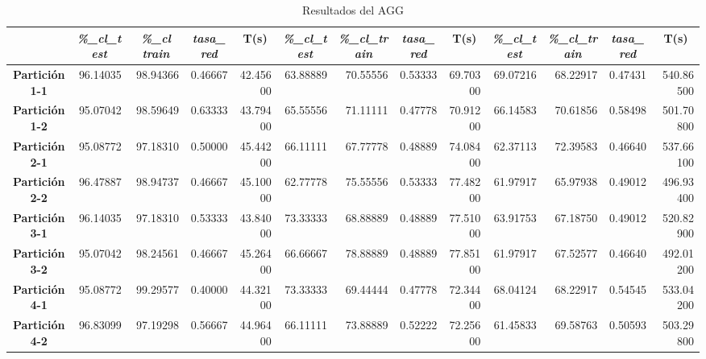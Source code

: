 \documentclass[a4paper,11pt]{article}
\begin{document}
 
 \begin{table}[H]	
    \caption*{Resultados del AGG}
    \begin{adjustbox}{width=1.1\textwidth}
    \begin{tabular}{|c|r|r|r|r|r|r|r|r|r|r|r|r|}
    \hline
    \multicolumn{1}{|l|}{} & \multicolumn{1}{c|}{\textbf{\textit{\%\_cl\_test}}} & \multicolumn{1}{c|}{\textbf{\textit{\%\_cl train}}} & \multicolumn{1}{c|}{\textbf{\textit{tasa\_red}}} & \multicolumn{1}{c|}{\textbf{T(s)}} & \multicolumn{1}{c|}{\textbf{\textit{\%\_cl\_test}}} & \multicolumn{1}{c|}{\textbf{\textit{\%\_cl\_train}}} & \multicolumn{1}{c|}{\textbf{\textit{tasa\_red}}} & \multicolumn{1}{c|}{\textbf{T(s)}} & \multicolumn{1}{c|}{\textbf{\textit{\%\_cl\_test}}} & \multicolumn{1}{c|}{\textbf{\textit{\%\_cl\_train}}} & \multicolumn{1}{c|}{\textbf{\textit{tasa\_red}}} & \multicolumn{1}{c|}{\textbf{T(s)}} \\ \hline
    \textbf{Partición 1-1} & 96.14035 & 98.94366 & 0.46667 & 42.45600 & 63.88889 & 70.55556 & 0.53333 & 69.70300 & 69.07216 & 68.22917 & 0.47431 & 540.86500 \\ \hline
    \textbf{Partición 1-2} & 95.07042 & 98.59649 & 0.63333 & 43.79400 & 65.55556 & 71.11111 & 0.47778 & 70.91200 & 66.14583 & 70.61856 & 0.58498 & 501.70800 \\ \hline
    \textbf{Partición 2-1} & 95.08772 & 97.18310 & 0.50000 & 45.44200 & 66.11111 & 67.77778 & 0.48889 & 74.08400 & 62.37113 & 72.39583 & 0.46640 & 537.66100 \\ \hline
    \textbf{Partición 2-2} & 96.47887 & 98.94737 & 0.46667 & 45.10000 & 62.77778 & 75.55556 & 0.53333 & 77.48200 & 61.97917 & 65.97938 & 0.49012 & 496.93400 \\ \hline
    \textbf{Partición 3-1} & 96.14035 & 97.18310 & 0.53333 & 43.84000 & 73.33333 & 68.88889 & 0.48889 & 77.51000 & 63.91753 & 67.18750 & 0.49012 & 520.82900 \\ \hline
    \textbf{Partición 3-2} & 95.07042 & 98.24561 & 0.46667 & 45.26400 & 66.66667 & 78.88889 & 0.48889 & 77.85100 & 61.97917 & 67.52577 & 0.46640 & 492.01200 \\ \hline
    \textbf{Partición 4-1} & 95.08772 & 99.29577 & 0.40000 & 44.32100 & 73.33333 & 69.44444 & 0.47778 & 72.34400 & 68.04124 & 68.22917 & 0.54545 & 533.04200 \\ \hline
    \textbf{Partición 4-2} & 96.83099 & 97.19298 & 0.56667 & 44.96400 & 66.11111 & 73.88889 & 0.52222 & 72.25600 & 61.45833 & 69.58763 & 0.50593 & 503.29800 \\ \hline

\end{tabular}
\end{adjustbox}
\end{table}
\end{document}

